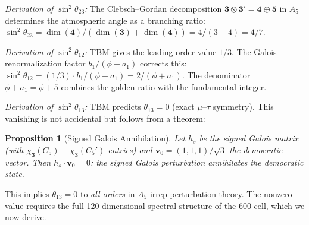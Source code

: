 \documentclass[12pt,a4paper]{article}
\newtheorem{proposition}{Proposition}
\theoremstyle{definition}
\begin{document}
\noindent\textit{Derivation of $\sin^2\theta_{23}$:} The Clebsch--Gordan decomposition $\mathbf{3} \otimes \mathbf{3'} = \mathbf{4} \oplus \mathbf{5}$ in $A_5$ determines the atmospheric angle as a branching ratio: $\sin^2\theta_{23} = \dim(\mathbf{4})/(\dim(\mathbf{3}) + \dim(\mathbf{4})) = 4/(3+4) = 4/7$.

\noindent\textit{Derivation of $\sin^2\theta_{12}$:} TBM gives the leading-order value $1/3$.  The Galois renormalization factor $b_1/(\phi + a_1)$ corrects this: $\sin^2\theta_{12} = (1/3) \cdot b_1/(\phi + a_1) = 2/(\phi + a_1)$.  The denominator $\phi + a_1 = \phi + 5$ combines the golden ratio with the fundamental integer.

\noindent\textit{Derivation of $\sin^2\theta_{13}$:} TBM predicts $\theta_{13} = 0$ (exact $\mu$--$\tau$ symmetry).  This vanishing is not accidental but follows from a theorem:

\begin{proposition}[Signed Galois Annihilation]
Let $h_s$ be the signed Galois matrix (with $\chi_{\mathbf{3}}(C_5) - \chi_{\mathbf{3}}(C_5')$ entries) and $\mathbf{v}_0 = (1,1,1)/\sqrt{3}$ the democratic vector.  Then $h_s \cdot \mathbf{v}_0 = 0$: the signed Galois perturbation annihilates the democratic state.
\end{proposition}

\noindent This implies $\theta_{13} = 0$ to \emph{all orders} in $A_5$-irrep perturbation theory.  The nonzero value requires the full 120-dimensional spectral structure of the 600-cell, which we now derive.
\end{document}
